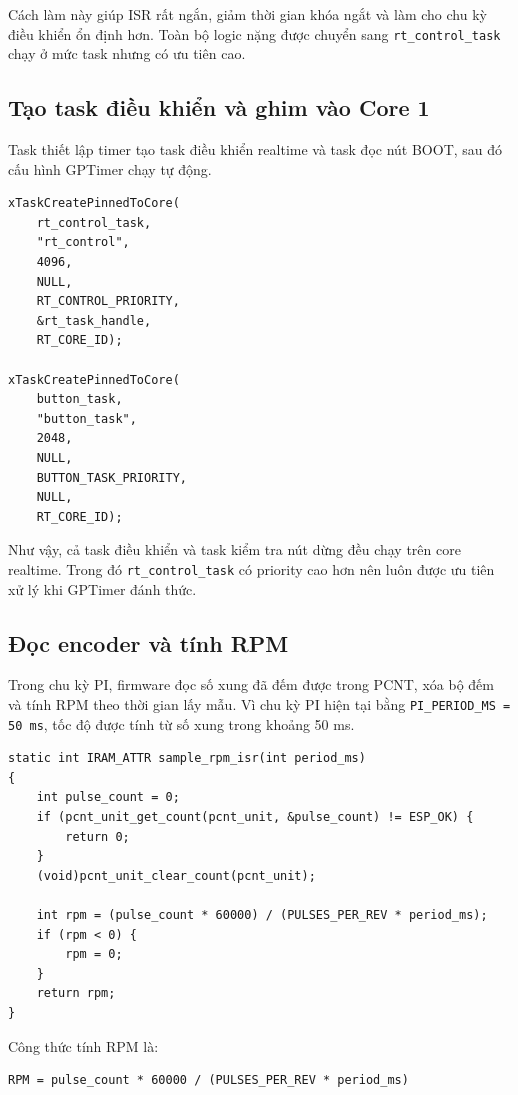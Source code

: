 \documentclass[12pt,a4paper]{report}
\begin{document}
Cách làm này giúp ISR rất ngắn, giảm thời gian khóa ngắt và làm cho chu kỳ điều khiển ổn định hơn. Toàn bộ logic nặng được chuyển sang \texttt{rt\_control\_task} chạy ở mức task nhưng có ưu tiên cao.

\subsection{Tạo task điều khiển và ghim vào Core 1}

Task thiết lập timer tạo task điều khiển realtime và task đọc nút BOOT, sau đó cấu hình GPTimer chạy tự động.

\begin{lstlisting}
xTaskCreatePinnedToCore(
    rt_control_task,
    "rt_control",
    4096,
    NULL,
    RT_CONTROL_PRIORITY,
    &rt_task_handle,
    RT_CORE_ID);

xTaskCreatePinnedToCore(
    button_task,
    "button_task",
    2048,
    NULL,
    BUTTON_TASK_PRIORITY,
    NULL,
    RT_CORE_ID);
\end{lstlisting}

Như vậy, cả task điều khiển và task kiểm tra nút dừng đều chạy trên core realtime. Trong đó \texttt{rt\_control\_task} có priority cao hơn nên luôn được ưu tiên xử lý khi GPTimer đánh thức.

\subsection{Đọc encoder và tính RPM}

Trong chu kỳ PI, firmware đọc số xung đã đếm được trong PCNT, xóa bộ đếm và tính RPM theo thời gian lấy mẫu. Vì chu kỳ PI hiện tại bằng \texttt{PI\_PERIOD\_MS = 50 ms}, tốc độ được tính từ số xung trong khoảng 50 ms.

\begin{lstlisting}
static int IRAM_ATTR sample_rpm_isr(int period_ms)
{
    int pulse_count = 0;
    if (pcnt_unit_get_count(pcnt_unit, &pulse_count) != ESP_OK) {
        return 0;
    }
    (void)pcnt_unit_clear_count(pcnt_unit);

    int rpm = (pulse_count * 60000) / (PULSES_PER_REV * period_ms);
    if (rpm < 0) {
        rpm = 0;
    }
    return rpm;
}
\end{lstlisting}

Công thức tính RPM là:

\begin{lstlisting}
RPM = pulse_count * 60000 / (PULSES_PER_REV * period_ms)
\end{lstlisting}
\end{document}
